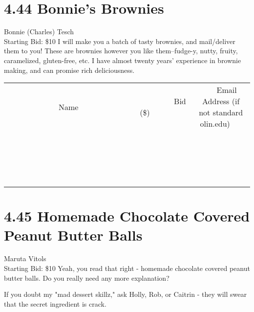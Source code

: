 \documentclass[11pt]{article}
\begin{document}
\section*{4.44 Bonnie's Brownies}
Bonnie (Charles) Tesch
\\
Starting Bid: \$10
\newline
I will make you a batch of tasty brownies, and mail/deliver them to you! These are brownies however you like them--fudge-y, nutty, fruity, caramelized, gluten-free, etc. I have almost twenty years' experience in brownie making, and can promise rich deliciousness.
\\[3ex]
\begin{tabular}{c c c}
~~~~~~~~~~~~~Name~~~~~~~~~~~~~ & ~~~~~~~~~Bid (\$)~~~~~~~~~  & ~~~Email Address (if not standard olin.edu)~~~\\
 & & \\
\hline
 & & \\
\hline
 & & \\
\hline
 & & \\
\hline
 & & \\
\hline
 & & \\
\hline
 & & \\
\hline
 & & \\
\hline
 & & \\
\hline
 & & \\
\hline
 & & \\
\hline
 & & \\
\hline
 & & \\
\hline
 & & \\
\hline
 & & \\
\hline
 & & \\
\hline
 & & \\
\hline
 & & \\
\hline
 & & \\
\hline
\end{tabular}
\newpage
\section*{4.45 Homemade Chocolate Covered Peanut Butter Balls}
Maruta Vitols
\\
Starting Bid: \$10
\newline
Yeah, you read that right - homemade chocolate covered peanut butter balls. Do you really need any more explanation?

If you doubt my "mad dessert skillz," ask Holly, Rob, or Caitrin - they will swear that the secret ingredient is crack. 
\end{document}
